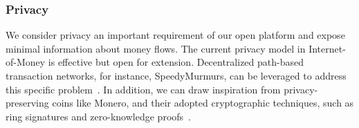 \subsubsection*{Privacy}
We consider privacy an important requirement of our open platform and expose minimal information about money flows.
The current privacy model in Internet-of-Money is effective but open for extension.
Decentralized path-based transaction networks, for instance, SpeedyMurmurs, can be leveraged to address this specific problem~\cite{roos2017settling}.
In addition, we can draw inspiration from privacy-preserving coins like Monero, and their adopted cryptographic techniques, such as ring signatures and zero-knowledge proofs~\cite{bunz2018bulletproofs,poelstra2018confidential}.




